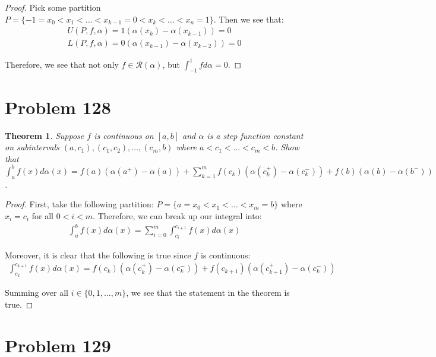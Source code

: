 \documentclass[psamsfonts]{amsart}
\newtheorem{thm}{Theorem}[section]
\theoremstyle{definition}
\theoremstyle{remark}
\numberwithin{equation}{section}
\begin{document}
\begin{proof}
Pick some partition $P = \{ -1 = x_0 < x_1 < \ldots < x_{k-1} = 0 < x_k < \ldots < x_n = 1 \}$. Then we see that:
\begin{eqnarray}
U(P,f,\alpha) = 1 (\alpha(x_k) - \alpha(x_{k-1})) = 0\\
L(P,f,\alpha) = 0 (\alpha(x_{k-1}) - \alpha(x_{k-2})) = 0 
\end{eqnarray}

Therefore, we see that not only $f \in \mathscr{R}(\alpha)$, but $\int_{-1}^1 f d\alpha = 0$. 
\end{proof}

\section{Problem 128}

\begin{thm}
Suppose $f$ is continuous on $[a,b]$ and $\alpha$ is a step function constant on subintervals $(a,c_1),(c_1,c_2), \ldots, (c_m,b)$ where $a < c_1 < \ldots < c_m < b$. Show that $\int_a^b f(x) d \alpha(x) = f(a) (\alpha(a^{+}) - \alpha(a)) + \sum_{k=1}^m f(c_k) (\alpha(c_k^{+}) - \alpha(c_k^{-})) + f(b) (\alpha(b) - \alpha(b^{-}))$. 
\end{thm}

\begin{proof}
First, take the following partition: $P = \{ a = x_0 < x_1 < \ldots < x_m = b \}$ where $x_i = c_i$ for all $0 < i < m$. Therefore, we can break up our integral into:
\begin{eqnarray}
\int_{a}^b f(x) d \alpha(x) = \sum_{i=0}^m \int_{c_{i}}^{c_{i+1}} f(x) d \alpha(x)
\end{eqnarray}

Moreover, it is clear that the following is true since $f$ is continuous:
\begin{eqnarray}
\int_{c_k}^{c_{k+1}} f(x) d \alpha(x) =  f(c_k) (\alpha(c_{k}^{+}) - \alpha(c_k^{-})) + f(c_{k+1}) (\alpha(c_{k+1}^{+}) - \alpha(c_k^{-}))
\end{eqnarray}

Summing over all $i \in \{0, 1, \ldots, m \}$, we see that the statement in the theorem is true.
\end{proof}

\section{Problem 129}
\end{document}
